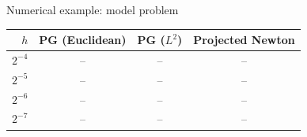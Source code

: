 \documentclass[main.tex]{subfiles}
\begin{document}
\begin{frame}{Numerical example: model problem}
  \vspace{1ex}
  \begin{center}
  \renewcommand{\arraystretch}{1.2}
  \begin{tabular}{@{}rccc@{}}
    \toprule
    $h$ & PG (Euclidean) & PG ($L^2$) & Projected Newton \\
    \midrule
    $2^{-4}$ & -- & -- & -- \\
    $2^{-5}$ & -- & -- & -- \\
    $2^{-6}$ & -- & -- & -- \\
    $2^{-7}$ & -- & -- & -- \\
    \bottomrule
  \end{tabular}
  \end{center}
  \vspace{1ex}
\end{frame}
\end{document}

